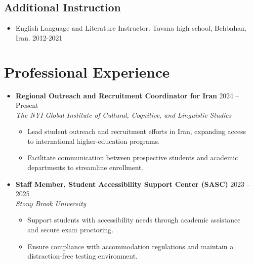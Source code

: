 \documentclass[a4paper,10pt]{article}
\begin{document}
\subsection*{Additional Instruction}
\begin{itemize}
    \item English Language and Literature Instructor. Tavana high school, Behbahan, Iran. \hfill 2012-2021
    
\end{itemize}
\section*{Professional Experience}
\begin{itemize}[leftmargin=0.5cm, label={}]
    \item \textbf{Regional Outreach and Recruitment Coordinator for Iran} \hfill 2024 -- Present \\
    \textit{The NYI Global Institute of Cultural, Cognitive, and Linguistic Studies}
    \begin{itemize}[leftmargin=0.5cm, label={$\bullet$}]
        \item Lead student outreach and recruitment efforts in Iran, expanding access to international higher-education programs.
        \item Facilitate communication between prospective students and academic departments to streamline enrollment.
    \end{itemize}

    \vspace{0.15in}

    \item \textbf{Staff Member, Student Accessibility Support Center (SASC)} \hfill 2023 -- 2025 \\
    \textit{Stony Brook University}
    \begin{itemize}[leftmargin=0.5cm, label={$\bullet$}]
        \item Support students with accessibility needs through academic assistance and secure exam proctoring.
        \item Ensure compliance with accommodation regulations and maintain a distraction-free testing environment.
    \end{itemize}

    \vspace{0.15in}


\end{itemize}
\end{document}
